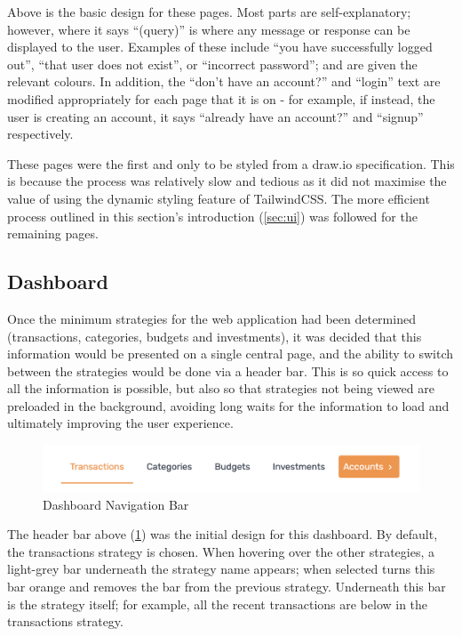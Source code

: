 Above is the basic design for these pages. Most parts are self-explanatory; however, where it says ``(query)'' is where any message or response can be displayed to the user. Examples of these include ``you have successfully logged out'', ``that user does not exist'', or ``incorrect password''; and are given the relevant colours. In addition, the ``don't have an account?'' and ``login'' text are modified appropriately for each page that it is on - for example, if instead, the user is creating an account, it says ``already have an account?'' and ``signup'' respectively.

These pages were the first and only to be styled from a draw.io specification. This is because the process was relatively slow and tedious as it did not maximise the value of using the dynamic styling feature of TailwindCSS. The more efficient process outlined in this section's introduction (\ref{sec:ui}) was followed for the remaining pages.

\subsection{Dashboard}
Once the minimum strategies for the web application had been determined (transactions, categories, budgets and investments), it was decided that this information would be presented on a single central page, and the ability to switch between the strategies would be done via a header bar. This is so quick access to all the information is possible, but also so that strategies not being viewed are preloaded in the background, avoiding long waits for the information to load and ultimately improving the user experience.

\begin{figure}[H]
	\centering
	\includegraphics[width=\textwidth]{images/header_navigation_bar.png}
	\caption{Dashboard Navigation Bar}
	\label{fig:DashboardNavigationBar}
\end{figure}

The header bar above (\ref{fig:DashboardNavigationBar}) was the initial design for this dashboard. By default, the transactions strategy is chosen. When hovering over the other strategies, a light-grey bar underneath the strategy name appears; when selected turns this bar orange and removes the bar from the previous strategy. Underneath this bar is the strategy itself; for example, all the recent transactions are below in the transactions strategy.

